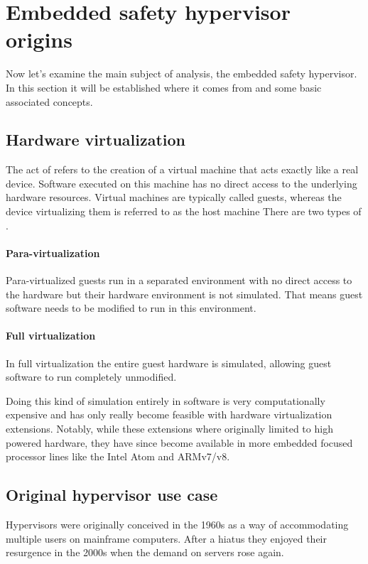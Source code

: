 
\section{Embedded safety hypervisor origins}
Now let's examine the main subject of analysis, the embedded safety hypervisor. In this section it will be established where it comes from and some basic associated concepts.
\subsection{Hardware virtualization}
The act of  refers to the creation of a virtual machine  that acts exactly like a real device. Software executed on this machine has no direct access to the underlying hardware resources. Virtual machines are typically called guests, whereas the device virtualizing them is referred to as the host machine
There are two types of .
\paragraph{Para-virtualization}
Para-virtualized guests run in a separated environment with no direct access to the hardware but their hardware environment is not simulated. That means guest software needs to be modified to run in this environment.
\paragraph{Full virtualization}
In full virtualization the entire guest hardware is simulated, allowing guest software to run completely unmodified.

Doing this kind of simulation entirely in software is very computationally expensive and has only really become feasible with hardware virtualization extensions.
Notably, while these extensions where originally limited to high powered hardware, they have since become available in more embedded focused processor lines like the Intel Atom and ARMv7/v8.
\subsection{Original hypervisor use case}
Hypervisors were originally conceived in the 1960s as a way of accommodating multiple users on mainframe computers. After a hiatus they enjoyed their resurgence in the 2000s when the demand on servers rose again. 

